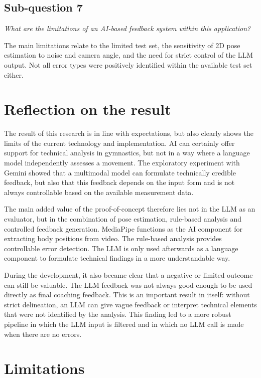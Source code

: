 \subsection{Sub-question 7}

\textit{What are the limitations of an AI-based feedback system within this application?}

The main limitations relate to the limited test set, the sensitivity of 2D pose estimation to noise and camera angle, and the need for strict control of the LLM output. Not all error types were positively identified within the available test set either.

\section{Reflection on the result}

The result of this research is in line with expectations, but also clearly shows the limits of the current technology and implementation. AI can certainly offer support for technical analysis in gymnastics, but not in a way where a language model independently assesses a movement. The exploratory experiment with Gemini showed that a multimodal model can formulate technically credible feedback, but also that this feedback depends on the input form and is not always controllable based on the available measurement data.

The main added value of the proof-of-concept therefore lies not in the LLM as an evaluator, but in the combination of pose estimation, rule-based analysis and controlled feedback generation. MediaPipe functions as the AI component for extracting body positions from video. The rule-based analysis provides controllable error detection. The LLM is only used afterwards as a language component to formulate technical findings in a more understandable way.

During the development, it also became clear that a negative or limited outcome can still be valuable. The LLM feedback was not always good enough to be used directly as final coaching feedback. This is an important result in itself: without strict delineation, an LLM can give vague feedback or interpret technical elements that were not identified by the analysis. This finding led to a more robust pipeline in which the LLM input is filtered and in which no LLM call is made when there are no errors.

\section{Limitations}
\label{sec:beperkingen}

